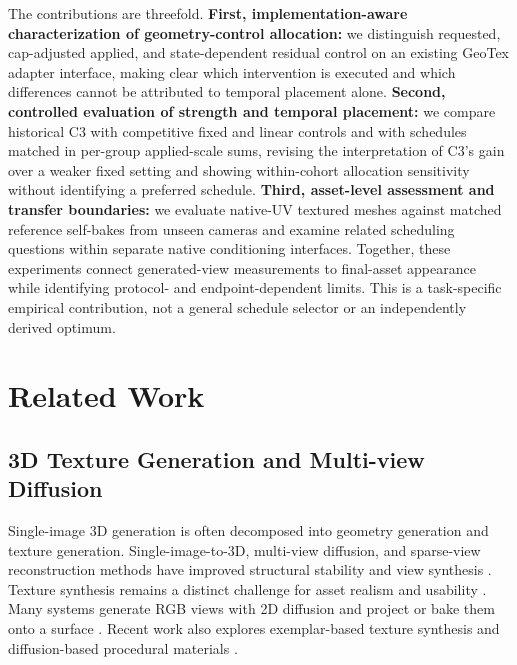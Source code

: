 \documentclass[times,twocolumn,final]{elsarticle}
\begin{document}
The contributions are threefold. \textbf{First, implementation-aware characterization of geometry-control allocation:} we distinguish requested, cap-adjusted applied, and state-dependent residual control on an existing GeoTex adapter interface, making clear which intervention is executed and which differences cannot be attributed to temporal placement alone. \textbf{Second, controlled evaluation of strength and temporal placement:} we compare historical C3 with competitive fixed and linear controls and with schedules matched in per-group applied-scale sums, revising the interpretation of C3's gain over a weaker fixed setting and showing within-cohort allocation sensitivity without identifying a preferred schedule. \textbf{Third, asset-level assessment and transfer boundaries:} we evaluate native-UV textured meshes against matched reference self-bakes from unseen cameras and examine related scheduling questions within separate native conditioning interfaces. Together, these experiments connect generated-view measurements to final-asset appearance while identifying protocol- and endpoint-dependent limits. This is a task-specific empirical contribution, not a general schedule selector or an independently derived optimum.

\section{Related Work}
\label{sec:related}

\subsection{3D Texture Generation and Multi-view Diffusion}
\label{subsec:3dtex}

Single-image 3D generation is often decomposed into geometry generation and texture generation. Single-image-to-3D, multi-view diffusion, and sparse-view reconstruction methods have improved structural stability and view synthesis \cite{liu2023zero1to3,shi2023zero123pp,liu2023syncdreamer,long2023wonder3d,shi2024mvdream,wang2023imagedream,xu2024instantmesh,ke2024era3d}. Texture synthesis remains a distinct challenge for asset realism and usability \cite{perla2026survey}. Many systems generate RGB views with 2D diffusion and project or bake them onto a surface \cite{chen2023text2tex,richardson2023texture,poole2023dreamfusion,chen2023fantasia3d}. Recent work also explores exemplar-based texture synthesis and diffusion-based procedural materials \cite{guzman2026adaptive,lv2025interpretable}.
\end{document}
